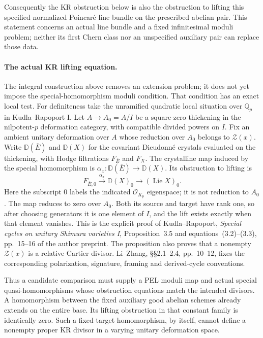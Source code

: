 \documentclass[11pt]{article}
\newcommand{\Q}{\mathbb Q}\newcommand{\C}{\mathbb C}\newcommand{\Z}{\mathbb Z}\newcommand{\R}{\mathbb R}\newcommand{\A}{\mathbb A}\newcommand{\OO}{\mathcal O}
\theoremstyle{definition}\newtheorem{definition}[theorem]{Definition}\newtheorem{remark}[theorem]{Remark}
\begin{document}
Consequently the KR obstruction below is also the
obstruction to lifting this specified normalized
Poincar\'e line bundle on the prescribed abelian
pair.  This statement concerns an actual line bundle
and a fixed infinitesimal moduli problem; neither its
first Chern class nor an unspecified auxiliary pair
can replace those data.

\paragraph{The actual KR lifting equation.}
The integral construction above removes an extension problem;
it does not yet impose the special-homomorphism moduli condition.
That condition has an exact local test.
For definiteness take the unramified quadratic local situation
over $\Q_p$ in Kudla--Rapoport I.
Let $A\to A_0=A/I$ be a square-zero thickening in the
nilpotent-$p$ deformation category, with compatible divided
powers on $I$.  Fix an ambient unitary deformation over $A$
whose reduction over $A_0$ belongs to $\mathcal Z(x)$.
Write $\mathbb D(\overline E)$ and $\mathbb D(X)$ for the
covariant Dieudonn\'e crystals evaluated on the thickening,
with Hodge filtrations $F_{\overline E}$ and $F_X$.
The crystalline map induced by the special homomorphism is
$\alpha_x:\mathbb D(\overline E)\to\mathbb D(X)$.
Its obstruction to lifting is
\begin{equation}\label{C23-obstruction}
 F_{\overline E,0}\xrightarrow{\alpha_x}
       \mathbb D(X)_0\longrightarrow(\operatorname{Lie}X)_0.
\end{equation}
Here the subscript $0$ labels the indicated
$\mathcal O_{K_p}$ eigenspace; it is not reduction to $A_0$.
The map reduces to zero over $A_0$.
Both its source and target have rank one, so after choosing
generators it is one element of $I$, and the lift exists
exactly when that element vanishes.
This is the explicit proof of Kudla--Rapoport,
\emph{Special cycles on unitary Shimura varieties I},
Proposition~3.5 and equations~(3.2)--(3.3), pp.~15--16
of the author preprint.  The proposition also proves that a
nonempty $\mathcal Z(x)$ is a relative Cartier divisor.
Li--Zhang, \S\S2.1--2.4, pp.~10--12, fixes the corresponding
polarization, signature, framing and derived-cycle conventions.

Thus a candidate comparison must supply a PEL moduli map
and actual special quasi-homomorphisms whose obstruction
equations match the intended divisors.  A homomorphism between
the fixed auxiliary good abelian schemes already extends on
the entire base.  Its lifting obstruction in that constant
family is identically zero.  Such a fixed-target homomorphism,
by itself, cannot define a nonempty proper KR divisor in a
varying unitary deformation space.
\end{document}
